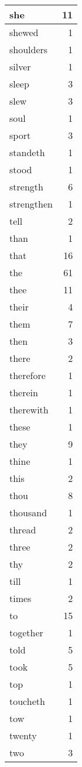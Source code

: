\begin{center}
\begin{longtable}{l|r}
she & 11\\ \hline 
shewed & 1\\ \hline 
shoulders & 1\\ \hline 
silver & 1\\ \hline 
sleep & 3\\ \hline 
slew & 3\\ \hline 
soul & 1\\ \hline 
sport & 3\\ \hline 
standeth & 1\\ \hline 
stood & 1\\ \hline 
strength & 6\\ \hline 
strengthen & 1\\ \hline 
tell & 2\\ \hline 
than & 1\\ \hline 
that & 16\\ \hline 
the & 61\\ \hline 
thee & 11\\ \hline 
their & 4\\ \hline 
them & 7\\ \hline 
then & 3\\ \hline 
there & 2\\ \hline 
therefore & 1\\ \hline 
therein & 1\\ \hline 
therewith & 1\\ \hline 
these & 1\\ \hline 
they & 9\\ \hline 
thine & 1\\ \hline 
this & 2\\ \hline 
thou & 8\\ \hline 
thousand & 1\\ \hline 
thread & 2\\ \hline 
three & 2\\ \hline 
thy & 2\\ \hline 
till & 1\\ \hline 
times & 2\\ \hline 
to & 15\\ \hline 
together & 1\\ \hline 
told & 5\\ \hline 
took & 5\\ \hline 
top & 1\\ \hline 
toucheth & 1\\ \hline 
tow & 1\\ \hline 
twenty & 1\\ \hline 
two & 3\\ \hline 

\end{longtable}
\end{center}

